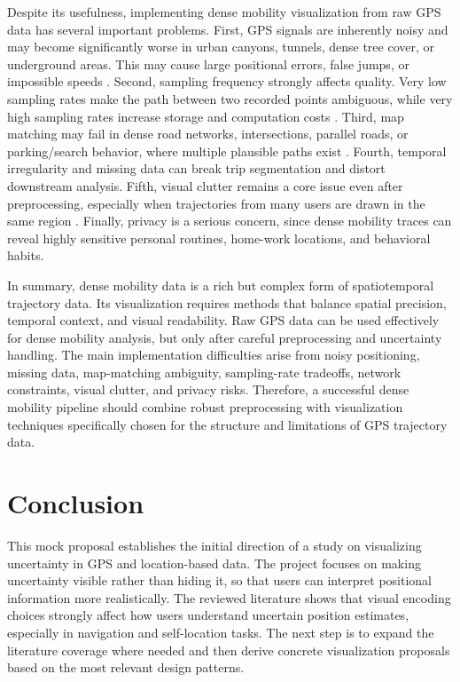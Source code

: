 \documentclass[conference]{IEEEtran}
\begin{document}
Despite its usefulness, implementing dense mobility visualization from raw GPS data has several important problems. First, GPS signals are inherently noisy and may become significantly worse in urban canyons, tunnels, dense tree cover, or underground areas. This may cause large positional errors, false jumps, or impossible speeds \cite{Zheng2015,MillardBall2019}. Second, sampling frequency strongly affects quality. Very low sampling rates make the path between two recorded points ambiguous, while very high sampling rates increase storage and computation costs \cite{Zheng2015}. Third, map matching may fail in dense road networks, intersections, parallel roads, or parking/search behavior, where multiple plausible paths exist \cite{MillardBall2019}. Fourth, temporal irregularity and missing data can break trip segmentation and distort downstream analysis. Fifth, visual clutter remains a core issue even after preprocessing, especially when trajectories from many users are drawn in the same region \cite{Sobral2019,Fadloun2022}. Finally, privacy is a serious concern, since dense mobility traces can reveal highly sensitive personal routines, home-work locations, and behavioral habits.

In summary, dense mobility data is a rich but complex form of spatiotemporal trajectory data. Its visualization requires methods that balance spatial precision, temporal context, and visual readability. Raw GPS data can be used effectively for dense mobility analysis, but only after careful preprocessing and uncertainty handling. The main implementation difficulties arise from noisy positioning, missing data, map-matching ambiguity, sampling-rate tradeoffs, network constraints, visual clutter, and privacy risks. Therefore, a successful dense mobility pipeline should combine robust preprocessing with visualization techniques specifically chosen for the structure and limitations of GPS trajectory data.

\section{Conclusion}

This mock proposal establishes the initial direction of a study on visualizing uncertainty in GPS and location-based data. The project focuses on making uncertainty visible rather than hiding it, so that users can interpret positional information more realistically. The reviewed literature shows that visual encoding choices strongly affect how users understand uncertain position estimates, especially in navigation and self-location tasks. The next step is to expand the literature coverage where needed and then derive concrete visualization proposals based on the most relevant design patterns.

\clearpage


\end{document}
